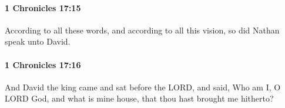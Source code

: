 		\paragraph{1 Chronicles 17:15} %
			\label{1CHRONICLES-17-15}

			According to all these words, and according to all this vision, so did Nathan speak unto David.


		\paragraph{1 Chronicles 17:16} %
			\label{1CHRONICLES-17-16}

			And David the king came and sat before the LORD, and said, Who am I, O LORD God, and what is mine house, that thou hast brought me hitherto?



